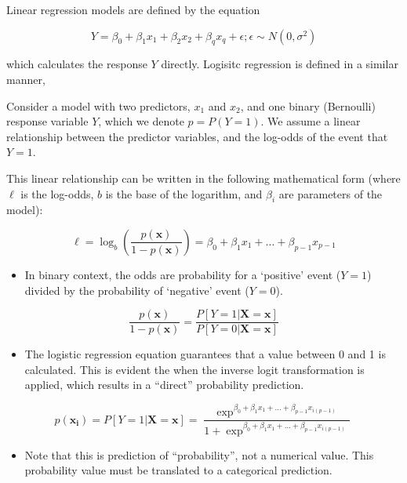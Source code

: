 \documentclass[11pt,dvipsnames,ignorenonframetext,aspectratio=169]{beamer}
\providecommand{\tightlist}{%
  \setlength{\itemsep}{0pt}\setlength{\parskip}{0pt}}
\begin{document}
\begin{frame}{}
\protect\hypertarget{section-2}{}
Linear regression models are defined by the equation

\[
Y = \beta_0 + \beta_1x_1 + \beta_2x_2 + \beta_qx_q + \epsilon; \epsilon \sim N(0, \sigma^2)
\]

which calculates the response \(Y\) directly. Logisitc regression is
defined in a similar manner,

Consider a model with two predictors, \({\displaystyle x_{1}}\) and
\({\displaystyle x_{2}}\), and one binary (Bernoulli) response variable
\({\displaystyle Y}\), which we denote \({\displaystyle p=P(Y=1)}\). We
assume a linear relationship between the predictor variables, and the
log-odds of the event that \({\displaystyle Y=1}\).

This linear relationship can be written in the following mathematical
form (where \(\ell\) is the log-odds, \(b\) is the base of the
logarithm, and \({\displaystyle \beta _{i}}\) are parameters of the
model):

\[
{\displaystyle \ell =\log _{b}\left({\frac {p(\mathbf{x})}{1-p(\mathbf{x})}}\right)=\beta _{0}+\beta _{1}x_{1}+...+\beta _{p-1}x_{p-1}}
\]
\end{frame}

\begin{frame}{}
\protect\hypertarget{section-3}{}
\begin{itemize}
\tightlist
\item
  In binary context, the odds are probability for a `positive' event
  (\(Y = 1\)) divided by the probability of `negative' event
  (\(Y = 0\)).
\end{itemize}

\[
\frac{p(\mathbf{x})}{1-p(\mathbf{x})} = \frac{P[Y = 1 | \mathbf{X} = \mathbf{x}]}{P[Y = 0 | \mathbf{X} = \mathbf{x}]}
\]

\begin{itemize}
\tightlist
\item
  The logistic regression equation guarantees that a value between 0 and
  1 is calculated. This is evident the when the inverse logit
  transformation is applied, which results in a ``direct'' probability
  prediction.
\end{itemize}

\[
p(\mathbf{x_i}) = P[Y = 1 | \mathbf{X} = \mathbf{x}] = \frac{\exp^{\beta_0 + \beta_1x_1 + ... + \beta_{p-1}x_{i(p-1)}}}{1 + \exp^{\beta_0 + \beta_1x_1 + ... + \beta_{p-1}x_{i(p-1)}}}
\]

\begin{itemize}
\tightlist
\item
  Note that this is prediction of ``probability'', not a numerical
  value. This probability value must be translated to a categorical
  prediction.
\end{itemize}
\end{frame}
\end{document}

